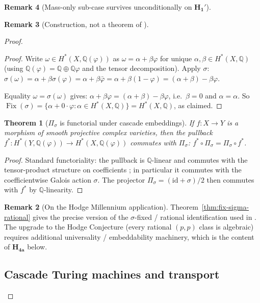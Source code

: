 \documentclass[11pt, a4paper]{amsart}
\newtheorem{theorem}{Theorem}[section]
\theoremstyle{definition}
\newtheorem{remark}[theorem]{Remark}
\newcommand{\Q}{\mathbb{Q}}
\newcommand{\pphi}{\varphi}
\newcommand{\Fix}{\operatorname{Fix}}
\begin{document}
\begin{remark}[Mass-only sub-case survives unconditionally on $\mathbf{H_1'}$]
\begin{remark}[Construction, not a theorem of \cite{CascadeEmbeddings}]
\begin{proof}
\begin{proof}
Write $\omega \in H^*(X, \Q(\pphi))$ as $\omega = \alpha + \beta
\pphi$ for unique $\alpha, \beta \in H^*(X, \Q)$ (using
$\Q(\pphi) = \Q \oplus \Q \pphi$ and the tensor decomposition).
Apply $\sigma$: $\sigma(\omega) = \alpha + \beta
\sigma(\pphi) = \alpha + \beta \bar\pphi = \alpha + \beta (1 -
\pphi) = (\alpha + \beta) - \beta \pphi$.

Equality $\omega = \sigma(\omega)$ gives: $\alpha + \beta \pphi =
(\alpha + \beta) - \beta \pphi$, i.e.\ $\beta = 0$ and $\alpha =
\alpha$. So $\Fix(\sigma) = \{\alpha + 0 \cdot \pphi : \alpha
\in H^*(X, \Q)\} = H^*(X, \Q)$, as claimed.
\end{proof}

\begin{theorem}[$\Pi_\sigma$ is functorial under cascade embeddings]
\label{thm:pisigma-functorial}
If $f \colon X \to Y$ is a morphism of smooth projective complex
varieties, then the pullback $f^* \colon H^*(Y, \Q(\pphi)) \to
H^*(X, \Q(\pphi))$ commutes with $\Pi_\sigma$:
$f^* \circ \Pi_\sigma = \Pi_\sigma \circ f^*$.
\end{theorem}

\begin{proof}
Standard functoriality: the pullback is $\Q$-linear and commutes
with the tensor-product structure on coefficients
\cite{GriffithsHarris}; in particular it commutes with the
coefficientwise Galois action $\sigma$. The projector $\Pi_\sigma
= (\mathrm{id} + \sigma)/2$ then commutes with $f^*$ by
$\Q$-linearity.
\end{proof}

\begin{remark}[On the Hodge Millennium application]
Theorem~\ref{thm:fix-sigma-rational} gives the precise version of
the $\sigma$-fixed / rational identification used in
\cite{MillenniumHodge}. The upgrade to the Hodge Conjecture (every
rational $(p, p)$ class is algebraic) requires additional
universality / embeddability machinery, which is the content of
$\mathbf{H_{4a}}$ below.
\end{remark}

\subsection{Cascade Turing machines and transport}
\label{subsec:ctm-tm}


\end{proof}
\end{remark}
\end{remark}
\end{document}
